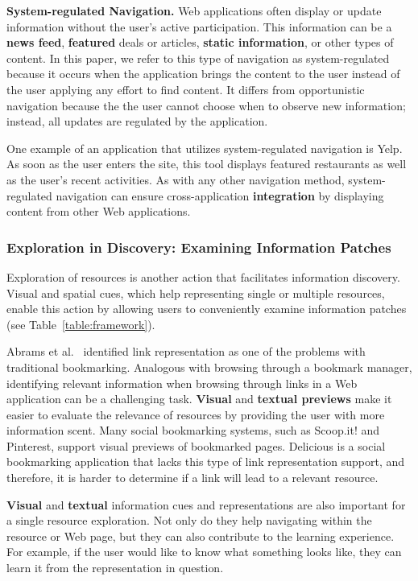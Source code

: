 \documentclass{sigchi}
\begin{document}
{\textbf{System-regulated Navigation.}
Web applications often display or update information without the user's active participation. This information can be a \textbf{news feed}, \textbf{featured} deals or articles, \textbf{static information}, or other types of content. In this paper, we refer to this type of navigation as system-regulated because it occurs when the application brings the content to the user instead of the user applying any effort to find content. It differs from opportunistic navigation because the the user cannot choose when to observe new information; instead, all updates are regulated by the application. 

One example of an application that utilizes system-regulated navigation is Yelp. As soon as the user enters the site, this tool displays featured restaurants as well as the user's recent activities. As with any other navigation method, system-regulated navigation can ensure cross-application \textbf{integration} by displaying content from other Web applications. 


{\subsubsection{Exploration in Discovery: Examining Information Patches}
Exploration of resources is another action that facilitates information discovery. Visual and spatial cues, which help representing single or multiple resources, enable this action by allowing users to conveniently examine information patches (see Table~\ref{table:framework}). 


Abrams et al.~\cite{abrams1998information} identified link representation as one of the problems with traditional bookmarking. Analogous with browsing through a bookmark manager, identifying relevant information when browsing through links in a Web application can be a challenging task. \textbf{Visual} and \textbf{textual previews} make it easier to evaluate the relevance of resources by providing the user with more information scent. Many social bookmarking systems, such as Scoop.it! and Pinterest, support visual previews of bookmarked pages. Delicious is a social bookmarking application that lacks this type of link representation support, and therefore, it is harder to determine if a link will lead to a relevant resource.

\textbf{Visual} and \textbf{textual} information cues and representations are also important for a single resource exploration. Not only do they help navigating within the resource or Web page, but they can also contribute to the learning experience. For example, if the user would like to know what something looks like, they can learn it from the representation in question.  

}}
\end{document}
